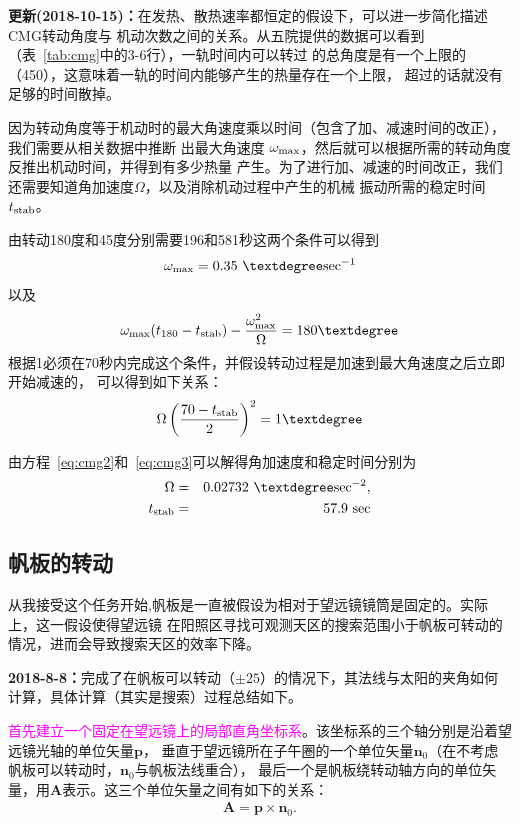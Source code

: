 \documentclass[a4paper,11pt]{ctexart}
\newcommand{\MT}[1]{\textcolor{magenta}{#1}}
\begin{document}
{\kaishu
\textbf{更新(2018-10-15)：}在发热、散热速率都恒定的假设下，可以进一步简化描述CMG转动角度与
机动次数之间的关系。从五院提供的数据可以看到（表~\ref{tab:cmg}中的3-6行），一轨时间内可以转过
的总角度是有一个上限的（450\textdegree），这意味着一轨的时间内能够产生的热量存在一个上限，
超过的话就没有足够的时间散掉。

因为转动角度等于机动时的最大角速度乘以时间（包含了加、减速时间的改正），我们需要从相关数据中推断
出最大角速度 $\omega_{\rm max}$，然后就可以根据所需的转动角度反推出机动时间，并得到有多少热量
产生。为了进行加、减速的时间改正，我们还需要知道角加速度$\Omega$，以及消除机动过程中产生的机械
振动所需的稳定时间$t_{\rm stab}$。

由转动180度和45度分别需要196和581秒这两个条件可以得到
\begin{eqnarray}
\omega_{\rm max} = 0.35 ~ {\textdegree \rm sec^{-1}}
\label{eq:cmg1}
\end{eqnarray}
以及
\begin{eqnarray}
\omega_{\rm max}(t_{180}-t_{\rm stab}) - \frac{\omega^2_{\rm max}}{\Omega} = 180\textdegree
\label{eq:cmg2}
\end{eqnarray}
根据1\textdegree 必须在70秒内完成这个条件，并假设转动过程是加速到最大角速度之后立即开始减速的，
可以得到如下关系：
\begin{eqnarray}
\Omega \left( \frac{70-t_{\rm stab}}{2} \right)^2 = 1 \textdegree
\label{eq:cmg3}
\end{eqnarray}

由方程~\eqref{eq:cmg2}和~\eqref{eq:cmg3}可以解得角加速度和稳定时间分别为
\begin{eqnarray}
\Omega &=& 0.02732 ~ {\textdegree  \rm sec^{-2}}, \\
t_{\rm stab} &=& 57.9 ~ {\rm sec}
\end{eqnarray}

}

\subsection{帆板的转动}
\label{sub:panel}
从我接受这个任务开始,帆板是一直被假设为相对于望远镜镜筒是固定的。实际上，这一假设使得望远镜
在阳照区寻找可观测天区的搜索范围小于帆板可转动的情况，进而会导致搜索天区的效率下降。

\textbf{2018-8-8：}完成了在帆板可以转动（$\pm 25$\textdegree）的情况下，其法线与太阳的夹角如何
计算，具体计算（其实是搜索）过程总结如下。

\MT{\heiti 首先建立一个固定在望远镜上的局部直角坐标系}。该坐标系的三个轴分别是沿着望远镜光轴的单位矢量$\bm{p}$，
垂直于望远镜所在子午圈的一个单位矢量$\bm{n}_{0}$（在不考虑帆板可以转动时，$\bm{n}_{0}$与帆板法线重合），
最后一个是帆板绕转动轴方向的单位矢量，用$\bm{A}$表示。这三个单位矢量之间有如下的关系：
\begin{eqnarray}
\bm{A}=\bm{p}\times\bm{n}_{0}.
\end{eqnarray}
\end{document}
